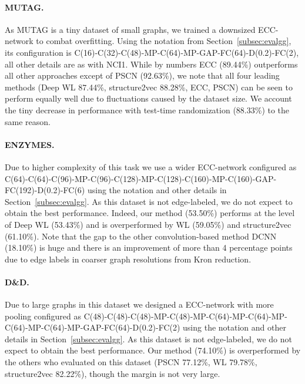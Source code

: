 \documentclass[10pt,twocolumn,letterpaper]{article}
\begin{document}
\paragraph*{MUTAG.} As MUTAG is a tiny dataset of small graphs, we trained a downsized ECC-network to combat overfitting. Using the notation from Section~\ref{subsec:evalgg}, its configuration is C(16)-C(32)-C(48)-MP-C(64)-MP-GAP-FC(64)-D(0.2)-FC(2), all other details are as with NCI1. While by numbers ECC (89.44\%) outperforms all other approaches except of PSCN \cite{niepert} (92.63\%), we note that all four leading methods (Deep WL \cite{deepkern} 87.44\%, structure2vec \cite{struct2vec} 88.28\%, ECC, PSCN) can be seen to perform equally well due to fluctuations caused by the dataset size. We account the tiny decrease in performance with test-time randomization (88.33\%) to the same reason.

\paragraph*{ENZYMES.} Due to higher complexity of this task we use a wider ECC-network configured as C(64)-C(64)-C(96)-MP-C(96)-C(128)-MP-C(128)-C(160)-MP-C(160)-GAP-FC(192)-D(0.2)-FC(6) using the notation and other details in Section~\ref{subsec:evalgg}. As this dataset is not edge-labeled, we do not expect to obtain the best performance. Indeed, our method (53.50\%) performs at the level of Deep WL \cite{deepkern} (53.43\%) and is overperformed by WL \cite{shervashidze} (59.05\%) and structure2vec \cite{struct2vec} (61.10\%). Note that the gap to the other convolution-based method DCNN \cite{dcnn} (18.10\%) is huge and there is an improvement of more than 4 percentage points due to edge labels in coarser graph resolutions from Kron reduction.

\paragraph*{D{\&}D.} Due to large graphs in this dataset we designed a ECC-network with more pooling configured as C(48)-C(48)-C(48)-MP-C(48)-MP-C(64)-MP-C(64)-MP-C(64)-MP-C(64)-MP-GAP-FC(64)-D(0.2)-FC(2) using the notation and other details in Section~\ref{subsec:evalgg}. As this dataset is not edge-labeled, we do not expect to obtain the best performance. Our method (74.10\%) is overperformed by the others who evaluated on this dataset (PSCN \cite{niepert} 77.12\%, WL \cite{shervashidze} 79.78\%, structure2vec \cite{struct2vec} 82.22\%), though the margin is not very large.
\end{document}
